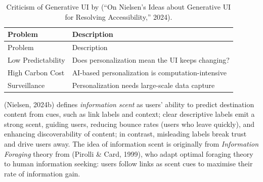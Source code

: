 \documentclass[
  12pt,
  letterpaper,
  DIV=11,
  numbers=noendperiod]{scrartcl}
\begin{document}
\begin{longtable}[]{@{}
  >{\raggedright\arraybackslash}p{}
  >{\raggedright\arraybackslash}p{}@{}}
\caption[Criticism of Generative UI]{Criticism of Generative UI by
({``On {Nielsen}'s Ideas about Generative {UI} for Resolving
Accessibility,''} 2024).}\tabularnewline
\toprule\noalign{}
\begin{minipage}[b]{\linewidth}\raggedright
Problem
\end{minipage} & \begin{minipage}[b]{\linewidth}\raggedright
Description
\end{minipage} \\
\midrule\noalign{}
\endfirsthead
\toprule\noalign{}
\begin{minipage}[b]{\linewidth}\raggedright
Problem
\end{minipage} & \begin{minipage}[b]{\linewidth}\raggedright
Description
\end{minipage} \\
\midrule\noalign{}
\endhead
\bottomrule\noalign{}
\endlastfoot
Low Predictability & Does personalization mean the UI keeps changing? \\
High Carbon Cost & AI-based personalization is computation-intensive \\
Surveillance & Personalization needs large-scale data capture \\
\end{longtable}

\let\pandoctableshortcapt\relax

(Nielsen, 2024b) defines \emph{information scent} as users' ability to
predict destination content from cues, such as link labels and context;
clear descriptive labels emit a strong scent, guiding users, reducing
bounce rates (users who leave quickly), and enhancing discoverability of
content; in contrast, misleading labels break trust and drive users
away. The idea of information scent is originally from \emph{Information
Foraging} theory from (Pirolli \& Card, 1999), who adapt optimal
foraging theory to human information seeking: users follow links as
scent cues to maximise their rate of information gain.
\end{document}
